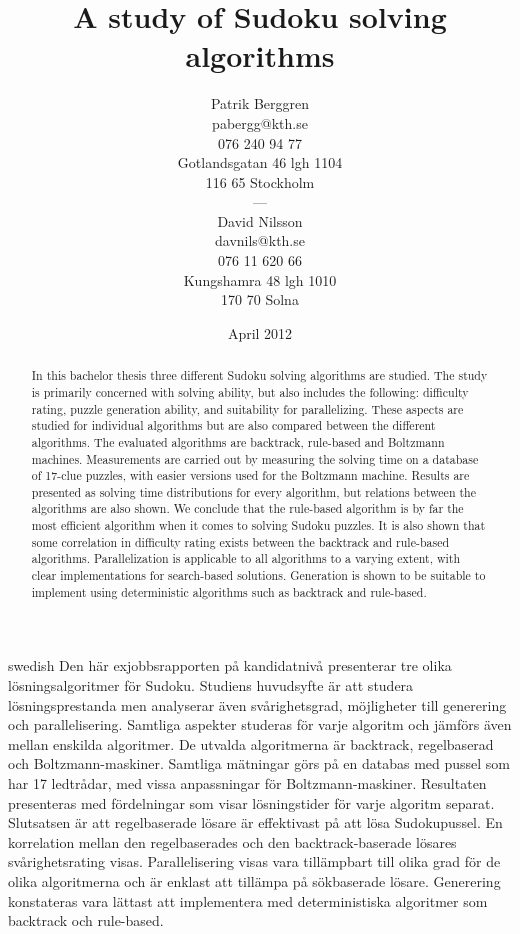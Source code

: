 \documentclass[a4paper,11pt]{kth-mag}
\title{A study of Sudoku solving algorithms}
\subtitle{}
\author{Patrik Berggren \\ pabergg@kth.se \\ 076 240 94 77 \\ Gotlandsgatan 46 lgh 1104 \\ 116 65 Stockholm \\--- \\ David Nilsson \\ davnils@kth.se \\ 076 11 620 66 \\ Kungshamra 48 lgh 1010 \\ 170 70 Solna }
\date{April 2012}
\begin{document}
\frontmatter
\pagestyle{empty}
\removepagenumbers
\maketitle
{}
\begin{abstract}
In this bachelor thesis three different Sudoku solving algorithms are studied.
The study is primarily concerned with solving ability, but also includes the following: difficulty rating, puzzle generation ability, and suitability for parallelizing.
These aspects are studied for individual algorithms but are also compared between the different algorithms.
The evaluated algorithms are backtrack, rule-based and Boltzmann machines.
Measurements are carried out by measuring the solving time on a database of 17-clue puzzles, with easier versions used for the Boltzmann machine.
Results are presented as solving time distributions for every algorithm, but relations between the algorithms are also shown.
We conclude that the rule-based algorithm is by far the most efficient algorithm when it comes to solving Sudoku puzzles.
It is also shown that some correlation in difficulty rating exists between the backtrack and rule-based algorithms.
Parallelization is applicable to all algorithms to a varying extent, with clear implementations for search-based solutions.
Generation is shown to be suitable to implement using deterministic algorithms such as backtrack and rule-based.

\end{abstract}
\clearpage
\begin{foreignabstract}{swedish}
Den här exjobbsrapporten på kandidatnivå presenterar tre olika lösningsalgoritmer för Sudoku.
Studiens huvudsyfte är att studera lösningsprestanda men analyserar även svårighetsgrad, möjligheter till generering och parallelisering.
Samtliga aspekter studeras för varje algoritm och jämförs även mellan enskilda algoritmer.
De utvalda algoritmerna är backtrack, regelbaserad och Boltzmann-maskiner.
Samtliga mätningar görs på en databas med pussel som har 17 ledtrådar, med vissa anpassningar för Boltzmann-maskiner.
Resultaten presenteras med fördelningar som visar lösningstider för varje algoritm separat. 
Slutsatsen är att regelbaserade lösare är effektivast på att lösa Sudokupussel.
En korrelation mellan den regelbaserades och den backtrack-baserade lösares svårighetsrating visas.
Parallelisering visas vara tillämpbart till olika grad för de olika algoritmerna och är enklast att tillämpa på sökbaserade lösare.
Generering konstateras vara lättast att implementera med deterministiska algoritmer som backtrack och rule-based.
\end{foreignabstract}
\clearpage
\end{document}
